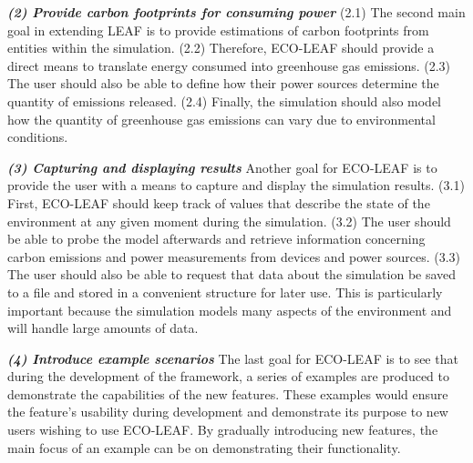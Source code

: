 \documentclass{l4proj}
\begin{document}
\textbf{\textit{(2) Provide carbon footprints for consuming power}}
(2.1)\label{goal2.1} The second main goal in extending LEAF is to provide estimations of carbon footprints from entities within the simulation.
(2.2)\label{goal2.2} Therefore, ECO-LEAF should provide a direct means to translate energy consumed into greenhouse gas emissions.
(2.3)\label{goal2.3} The user should also be able to define how their power sources determine the quantity of emissions released.
(2.4)\label{goal2.4} Finally, the simulation should also model how the quantity of greenhouse gas emissions can vary due to environmental conditions.

\textbf{\textit{(3) Capturing and displaying results}}
Another goal for ECO-LEAF is to provide the user with a means to capture and display the simulation results.
(3.1)\label{goal3.1} First, ECO-LEAF should keep track of values that describe the state of the environment at any given moment during the simulation.
(3.2)\label{goal3.2} The user should be able to probe the model afterwards and retrieve information concerning carbon emissions and power measurements from devices and power sources.
(3.3)\label{goal3.3} The user should also be able to request that data about the simulation be saved to a file and stored in a convenient structure for later use.
This is particularly important because the simulation models many aspects of the environment and will handle large amounts of data.

\textbf{\textit{(4) Introduce example scenarios}}
The last goal for ECO-LEAF is to see that during the development of the framework, a series of examples are produced to demonstrate the capabilities of the new features.
These examples would ensure the feature's usability during development and demonstrate its purpose to new users wishing to use ECO-LEAF.
By gradually introducing new features, the main focus of an example can be on demonstrating their functionality.
\end{document}
